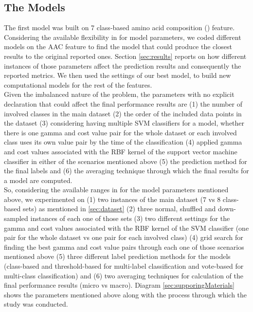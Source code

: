     
    \subsection{The Models}
    The first model was built on 7 class-based amino acid composition () feature. Considering the available 
    flexibility in \cite{mishra2014prediction} for model parameters, we coded different models on the AAC feature 
    to find the model that could produce the closest results to the original reported ones.  
    Section \ref{sec:results} reports on how different instances of those parameters affect the prediction results 
    and consequently the reported metrics. We then used the settings of our best model, to build new computational models 
    for the rest of the features.\\

    Given the imbalanced nature of the problem, the parameters with no explicit declaration that could affect the final 
    performance results are 
    (1) the number of involved classes in the main dataset 
    (2) the order of the included data points in the dataset
    (3) considering having multiple SVM classifiers for a model, whether there is one gamma and cost value pair for the whole 
    dataset or each involved class uses its own value pair by the time of the classification 
    (4) applied gamma and cost values associated with the RBF kernel of the support vector machine classifier in either of the 
    scenarios mentioned above
    (5) the prediction method for the final labels and 
    (6) the averaging technique through which the final results for a model are computed.\\
    
    So, considering the available ranges in \cite{mishra2014prediction} for the model parameters mentioned above, 
    we experimented on (1) two instances of the main dataset (7 vs 8 class-based sets) as mentioned in \ref{sec:dataset} 
    (2) three normal, shuffled and down-sampled instances of each one of those sets 
    (3) two different settings for the gamma and cost values associated with the RBF kernel of the SVM classifier 
    (one pair for the whole dataset vs one pair for each involved class) (4) grid search for finding the best gamma and cost value pairs 
    through each one of those scenarios mentioned above 
    (5) three different label prediction methods for the models (class-based and threshold-based for multi-label classification and 
    vote-based for multi-class classification) and (6) two averaging techniques for calculation of the final performance results 
    (micro vs macro). Diagram \ref{sec:supporingMaterials} shows the parameters mentioned above along with the process 
    through which the study was conducted.\\

